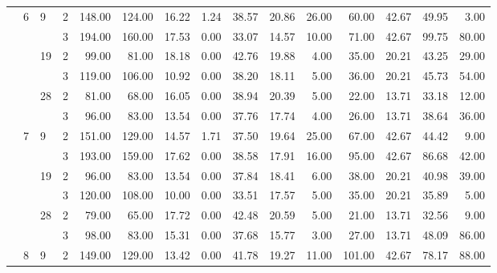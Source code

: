 \begin{tabular}{llllrrrrrrrrrrr}
\cline{2-15}
\cline{3-15}
               & \multirow{6}{*}{6} & \multirow{2}{*}{9} & 2 &   148.00 &    124.00 & 16.22 &    1.24 &   38.57 &   20.86 &   26.00 &   60.00 &   42.67 &  49.95 &     3.00 \\
               &   &    & 3 &   194.00 &    160.00 & 17.53 &    0.00 &   33.07 &   14.57 &   10.00 &   71.00 &   42.67 &  99.75 &    80.00 \\
\cline{3-15}
               &   & \multirow{2}{*}{19} & 2 &    99.00 &     81.00 & 18.18 &    0.00 &   42.76 &   19.88 &    4.00 &   35.00 &   20.21 &  43.25 &    29.00 \\
               &   &    & 3 &   119.00 &    106.00 & 10.92 &    0.00 &   38.20 &   18.11 &    5.00 &   36.00 &   20.21 &  45.73 &    54.00 \\
\cline{3-15}
               &   & \multirow{2}{*}{28} & 2 &    81.00 &     68.00 & 16.05 &    0.00 &   38.94 &   20.39 &    5.00 &   22.00 &   13.71 &  33.18 &    12.00 \\
               &   &    & 3 &    96.00 &     83.00 & 13.54 &    0.00 &   37.76 &   17.74 &    4.00 &   26.00 &   13.71 &  38.64 &    36.00 \\
\cline{2-15}
\cline{3-15}
               & \multirow{6}{*}{7} & \multirow{2}{*}{9} & 2 &   151.00 &    129.00 & 14.57 &    1.71 &   37.50 &   19.64 &   25.00 &   67.00 &   42.67 &  44.42 &     9.00 \\
               &   &    & 3 &   193.00 &    159.00 & 17.62 &    0.00 &   38.58 &   17.91 &   16.00 &   95.00 &   42.67 &  86.68 &    42.00 \\
\cline{3-15}
               &   & \multirow{2}{*}{19} & 2 &    96.00 &     83.00 & 13.54 &    0.00 &   37.84 &   18.41 &    6.00 &   38.00 &   20.21 &  40.98 &    39.00 \\
               &   &    & 3 &   120.00 &    108.00 & 10.00 &    0.00 &   33.51 &   17.57 &    5.00 &   35.00 &   20.21 &  35.89 &     5.00 \\
\cline{3-15}
               &   & \multirow{2}{*}{28} & 2 &    79.00 &     65.00 & 17.72 &    0.00 &   42.48 &   20.59 &    5.00 &   21.00 &   13.71 &  32.56 &     9.00 \\
               &   &    & 3 &    98.00 &     83.00 & 15.31 &    0.00 &   37.68 &   15.77 &    3.00 &   27.00 &   13.71 &  48.09 &    86.00 \\
\cline{2-15}
\cline{3-15}
               & \multirow{6}{*}{8} & \multirow{2}{*}{9} & 2 &   149.00 &    129.00 & 13.42 &    0.00 &   41.78 &   19.27 &   11.00 &  101.00 &   42.67 &  78.17 &    88.00 \\

\end{tabular}
